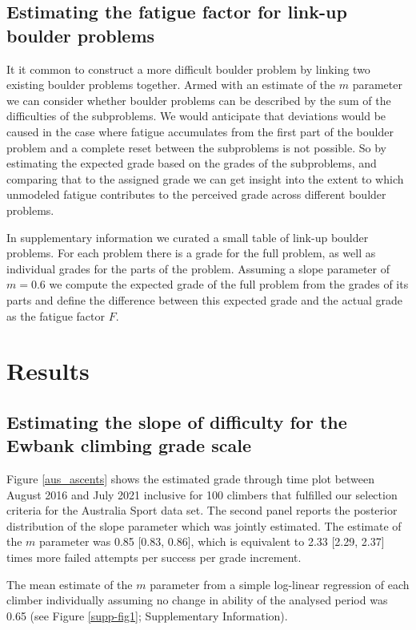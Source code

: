 \documentclass{article}
\begin{document}
\subsection*{Estimating the fatigue factor for link-up boulder problems}

It it common to construct a more difficult boulder problem by linking two existing boulder problems together. Armed with an estimate of the $m$ parameter we can consider whether boulder problems can be described by the sum of the difficulties of the subproblems. We would anticipate that deviations would be caused in the case where fatigue accumulates from the first part of the boulder problem and a complete reset between the subproblems is not possible. So by estimating the expected grade based on the grades of the subproblems, and comparing that to the assigned grade we can get insight into the extent to which unmodeled fatigue contributes to the perceived grade across different boulder problems.

In supplementary information we curated a small table of link-up boulder problems. For each problem there is a grade for the full problem, as well as individual grades for the parts of the problem. Assuming a slope parameter of $m=0.6$ we compute the expected grade of the full problem from the grades of its parts and define the difference between this expected grade and the actual grade as the fatigue factor $F$.

\section*{Results}

\subsection*{Estimating the slope of difficulty for the Ewbank climbing grade scale}


Figure \ref{aus_ascents} shows the estimated grade through time plot between August 2016 and July 2021 inclusive for 100 climbers that fulfilled our selection criteria for the Australia Sport data set. The second panel reports the posterior distribution of the slope parameter which was jointly estimated.
The estimate of the $m$ parameter was 0.85 [0.83, 0.86], which is equivalent to 2.33 [2.29, 2.37] times more failed attempts per success per grade increment. 

The mean estimate of the $m$ parameter from a simple log-linear regression of each climber individually assuming no change in ability of the analysed period was 0.65 (see Figure \ref{supp-fig1}; Supplementary Information). 
\end{document}
